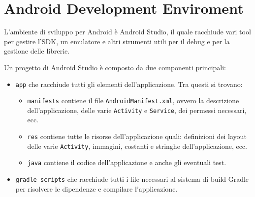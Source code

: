 \section{Android Development Enviroment}\label{android-development-enviroment}

L'ambiente di sviluppo per Android è Android Studio, il quale racchiude
vari tool per gestire l'SDK, un emulatore e altri strumenti utili per il
debug e per la gestione delle librerie.

Un progetto di Android Studio è composto da due componenti principali:

\begin{itemize}
	\item
		\texttt{app} che racchiude tutti gli elementi dell'applicazione. Tra
		questi si trovano:
	\begin{itemize}
		\item \texttt{manifests} contiene il file \texttt{AndroidManifest.xml}, ovvero la
			descrizione dell'applicazione, delle varie \texttt{Activity} e \texttt{Service}, dei
			permessi necessari, ecc.
		\item \texttt{res} contiene tutte le risorse dell'applicazione quali:
			definizioni dei layout delle varie \texttt{Activity}, immagini, costanti e
			stringhe dell'applicazione, ecc.
		\item \texttt{java} contiene il codice dell'applicazione e anche gli
			eventuali test.
	\end{itemize}
	\item \texttt{gradle scripts} che racchiude tutti i file necessari al
		sistema di build Gradle per risolvere le dipendenze e compilare
		l'applicazione.
\end{itemize}

